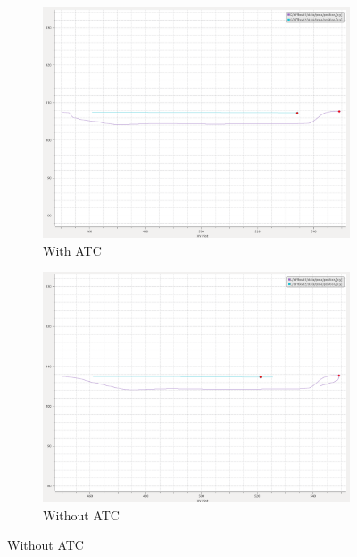          \begin{figure}[H]
        \centering
        
            \begin{subfigure}[b]{0.45\textwidth}
                \centering
                \includegraphics[width=\textwidth]{figs/plot_overtaking_E.png}
                \caption{With \ac{ATC}}
                \label{fig:plot_overtaking_E}
            \end{subfigure}
            \begin{subfigure}[b]{0.45\textwidth}
                \centering
                \includegraphics[width=\textwidth]{figs/plot_noATC_overtaking_E.png}
                \caption{Without \ac{ATC}}
                \label{fig:plot_noATC_overtaking_E}
            \end{subfigure}
            

\end{figure}
